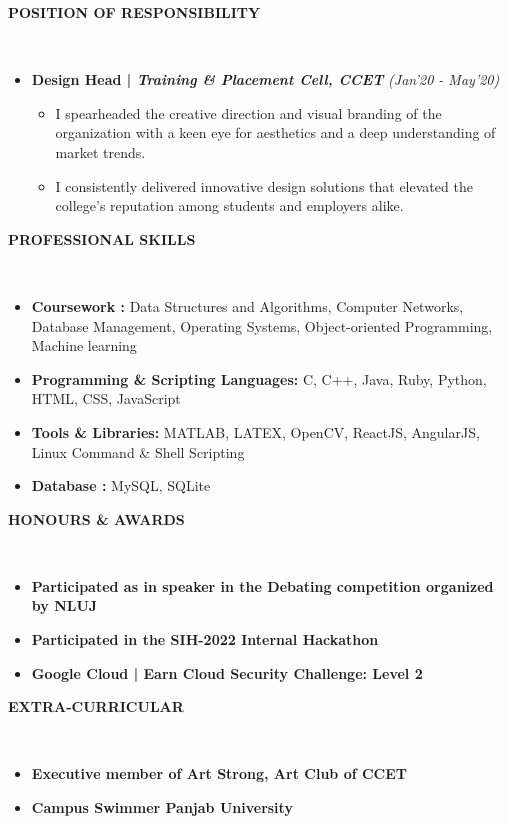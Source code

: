 \documentclass[a4paper,10pt]{article}
\newcommand{\resheading}[1]{{\small \colorbox{mygrey}{\begin{minipage}{0.99\textwidth}{\textbf{#1 \vphantom{p\^{E}}}}\end{minipage}}}}
\begin{document}
\noindent
\resheading{\textbf{POSITION OF RESPONSIBILITY}}\\[-0.3cm]
\begin{itemize}
    \item \textbf{Design Head | \textit{Training \& Placement Cell, CCET}} \hfill 
    \textit{(Jan'20 - May'20)}
    \begin{itemize}
        \item I spearheaded the creative direction and visual branding of the organization with a keen eye  for aesthetics and a deep understanding of market trends.
        \item I consistently delivered innovative design solutions that elevated the college's reputation among students and employers alike.
    \end{itemize}
   
    
    
\end{itemize}
\noindent
\resheading{\textbf{PROFESSIONAL SKILLS}}\\[-0.3cm]
    \begin{itemize}
        \setlength\itemsep{-0.3em}
         \item \textbf{Coursework :} Data Structures and Algorithms, Computer Networks, Database Management, Operating Systems, Object-oriented Programming, Machine learning
        \item \textbf{Programming \& Scripting Languages:}  C, C++, Java, Ruby, Python, HTML, CSS, JavaScript
        \item \textbf{Tools \& Libraries:} MATLAB, LATEX, OpenCV, ReactJS, AngularJS, Linux Command \& Shell Scripting
         \item \textbf{Database :} MySQL, SQLite
    \end{itemize} 
  
\noindent
\resheading{HONOURS \& AWARDS}\\[-0.3cm]
\begin{itemize}
    \setlength\itemsep{-0.3em}
    \item \textbf{Participated as in speaker in the Debating competition organized by NLUJ}
   \item \textbf{Participated in the SIH-2022 Internal Hackathon} 
\item \textbf {Google Cloud | Earn Cloud Security Challenge: Level 2}
\end{itemize}

\noindent
\resheading{\textbf{EXTRA-CURRICULAR}}\\[-0.3cm]
\begin{itemize}
\setlength\itemsep{-0.3em}
    \item \textbf{Executive member of  Art Strong, Art Club of CCET}
    \item \textbf{Campus Swimmer Panjab University}
\end{itemize}
\end{document}

